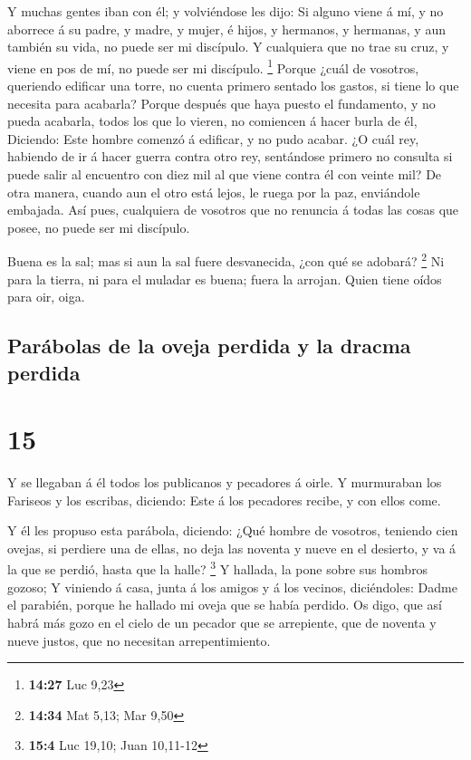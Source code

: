  Y muchas gentes iban con él; y volviéndose les dijo:
 Si alguno viene á mí, y no aborrece á su padre, y madre,
y mujer, é hijos, y hermanos, y hermanas, y aun también su vida, no
puede ser mi discípulo.  Y cualquiera que no trae su
cruz, y viene en pos de mí, no puede ser mi discípulo. \footnote{\textbf{14:27}
  Luc 9,23}  Porque ¿cuál de vosotros, queriendo edificar
una torre, no cuenta primero sentado los gastos, si tiene lo que
necesita para acabarla?  Porque después que haya puesto
el fundamento, y no pueda acabarla, todos los que lo vieren, no
comiencen á hacer burla de él,  Diciendo: Este hombre
comenzó á edificar, y no pudo acabar.  ¿O cuál rey,
habiendo de ir á hacer guerra contra otro rey, sentándose primero no
consulta si puede salir al encuentro con diez mil al que viene contra él
con veinte mil?  De otra manera, cuando aun el otro está
lejos, le ruega por la paz, enviándole embajada.  Así
pues, cualquiera de vosotros que no renuncia á todas las cosas que
posee, no puede ser mi discípulo.

 Buena es la sal; mas si aun la sal fuere desvanecida,
¿con qué se adobará? \footnote{\textbf{14:34} Mat 5,13; Mar 9,50}
 Ni para la tierra, ni para el muladar es buena; fuera la
arrojan. Quien tiene oídos para oir, oiga.

\hypertarget{paruxe1bolas-de-la-oveja-perdida-y-la-dracma-perdida}{%
\subsection{Parábolas de la oveja perdida y la dracma
perdida}\label{paruxe1bolas-de-la-oveja-perdida-y-la-dracma-perdida}}

\hypertarget{section-14}{%
\section{15}\label{section-14}}

 Y se llegaban á él todos los publicanos y pecadores á
oirle.  Y murmuraban los Fariseos y los escribas,
diciendo: Este á los pecadores recibe, y con ellos come.

 Y él les propuso esta parábola, diciendo: 
¿Qué hombre de vosotros, teniendo cien ovejas, si perdiere una de ellas,
no deja las noventa y nueve en el desierto, y va á la que se perdió,
hasta que la halle? \footnote{\textbf{15:4} Luc 19,10; Juan 10,11-12}
 Y hallada, la pone sobre sus hombros gozoso;
 Y viniendo á casa, junta á los amigos y á los vecinos,
diciéndoles: Dadme el parabién, porque he hallado mi oveja que se había
perdido.  Os digo, que así habrá más gozo en el cielo de
un pecador que se arrepiente, que de noventa y nueve justos, que no
necesitan arrepentimiento.


